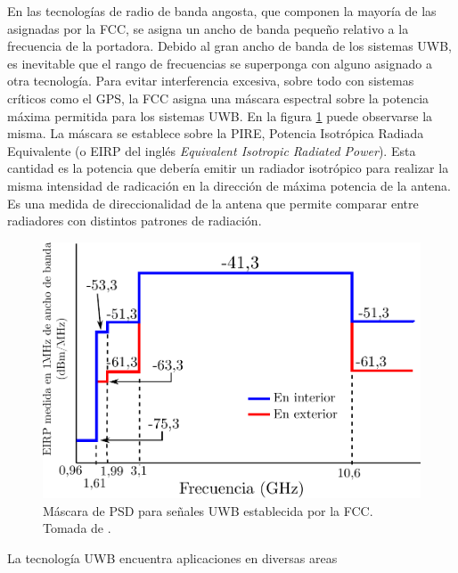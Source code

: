 En las tecnologías de radio de banda angosta, que componen la mayoría de las
asignadas por la FCC, se asigna un ancho de banda pequeño relativo a la
frecuencia de la portadora. Debido al gran ancho de banda de los sistemas UWB,
es inevitable que el rango de frecuencias se superponga con alguno asignado a
otra tecnología. Para evitar interferencia excesiva, sobre todo con sistemas
críticos como el GPS, la FCC asigna una máscara espectral sobre la potencia
máxima permitida para los sistemas UWB. En la figura \ref{fig:fcc_uwb_psd_mask}
puede observarse la misma.  La máscara se establece sobre la PIRE, Potencia
Isotrópica Radiada Equivalente (o EIRP del inglés \textit{Equivalent Isotropic
Radiated Power}). Esta cantidad es la potencia que debería emitir un radiador
isotrópico para realizar la misma intensidad de radicación en la dirección de
máxima potencia de la antena. Es una medida de direccionalidad de la antena que
permite comparar entre radiadores con distintos patrones de radiación.

\begin{figure}[t]
    \centering
    \includegraphics[width=0.7\linewidth]{images/fcc_uwb_psd_mask.pdf}
    \caption{Máscara de PSD para señales UWB establecida por la FCC. Tomada de \cite{Heydari2005}.}
    \label{fig:fcc_uwb_psd_mask}
\end{figure}

La tecnología UWB encuentra aplicaciones en diversas areas

